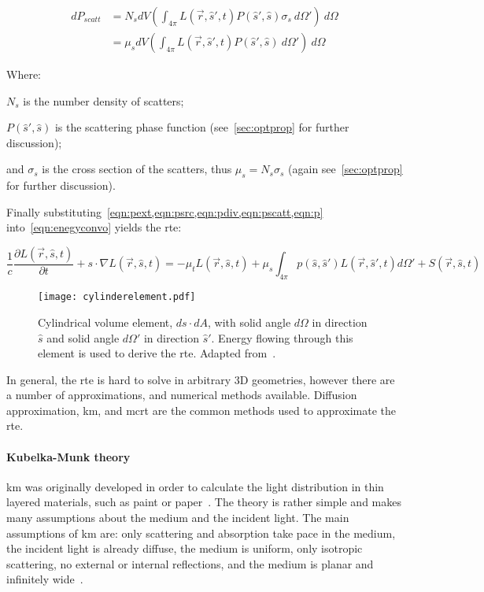 \begin{align}
	dP_{scatt}&=N_sdV\left(\int_{4\pi}L(\vec{r},\hat{s}',t)P(\hat{s}',\hat{s})\sigma_s\ d\Omega' \right)\ d\Omega \\
			  &=\mu_sdV\left(\int_{4\pi}L(\vec{r},\hat{s}',t)P(\hat{s}',\hat{s})\ d\Omega' \right)\ d\Omega 
			  \label{eqn:pscatt}
\end{align}

\noindent Where:

\indent $N_s$ is the number density of scatters;

\indent $P(\hat{s}',\hat{s})$ is the scattering phase function (see~\cref{sec:optprop} for further discussion);

\indent and $\sigma_s$ is the cross section of the scatters, thus $\mu_s=N_s\sigma_s$ (again see~\cref{sec:optprop} for further discussion).

\medskip


Finally substituting~\cref{eqn:pext,eqn:psrc,eqn:pdiv,eqn:pscatt,eqn:p} into~\cref{eqn:enegyconvo} yields the \gls{rte}:

\begin{equation}
\frac{1}{c}\frac{\partial L(\vec{r},\hat{s},t)}{\partial t} + s\cdot \nabla L(\vec{r},\hat{s},t)=-\mu_tL(\vec{r},\hat{s},t)+\mu_s\int_{4\pi}p(\hat{s},\hat{s}')L(\vec{r},\hat{s}',t)d\Omega' + S(\vec{r},\hat{s},t)
\label{eqn:rte}
\end{equation}

\begin{figure}[!htb]
	\centering
	\texttt{[image: cylinderelement.pdf]}
	\caption{Cylindrical volume element, $ds \cdot dA$, with solid angle $d\Omega$ in direction $\hat{s}$ and solid angle $d\Omega'$ in direction $\hat{s}'$. Energy flowing through this element is used to derive the \gls{rte}. Adapted from~\cite{wang2012biomedical,chandrasekhar2013radiative}.}
	\label{fig:energydiag2}
\end{figure}

In general, the \gls{rte} is hard to solve in arbitrary 3D geometries, however there are a number of approximations, and numerical methods available. Diffusion approximation, \gls{km}, and \gls{mcrt} are the common methods used to approximate the \gls{rte}.

\paragraph{Kubelka-Munk theory}
\gls{km} was originally developed in order to calculate the light distribution in thin layered materials, such as paint or paper~\cite{barbaric2011kubelka}. The theory is rather simple and makes many assumptions about the medium and the incident light. The main assumptions of \gls{km} are: only scattering and absorption take pace in the medium, the incident light is already diffuse, the medium is uniform, only isotropic scattering, no external or internal reflections, and the medium is planar and infinitely wide~\cite{jasinski2011modelling,cheong1990review,gabriela2013mathematical}.


